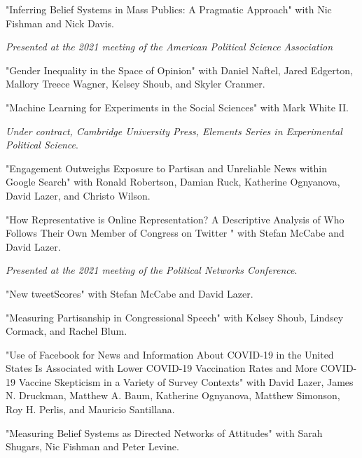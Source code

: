 \documentclass[letterpaper]{article}
\renewenvironment{itemize}{
  \begin{list}{}{
    \setlength{\leftmargin}{1.5em}
  }
}{
  \end{list}
}
\begin{document}
\begin{itemize}

\item "Inferring Belief Systems in Mass Publics: A Pragmatic Approach" with Nic Fishman and Nick Davis.
\begin{itemize}
\item \textit{Presented at the 2021 meeting of the American Political Science Association}
\end{itemize} 

\item "Gender Inequality in the Space of Opinion" with Daniel Naftel, Jared Edgerton, Mallory Treece Wagner, Kelsey Shoub, and Skyler Cranmer.

\item "Machine Learning for Experiments in the Social Sciences" with Mark White II.
\begin{itemize}
\item  \textit{Under contract, Cambridge University Press, Elements Series in Experimental Political Science}.
\end{itemize}

\item "Engagement Outweighs Exposure to Partisan and Unreliable News within Google Search" with Ronald Robertson, Damian Ruck, Katherine Ognyanova, David Lazer, and Christo Wilson.

\item "How Representative is Online Representation? A Descriptive Analysis of Who Follows Their Own Member of Congress on Twitter " with Stefan McCabe and David Lazer.
\begin{itemize}
\item \textit{Presented at the 2021 meeting of the Political Networks Conference}.
\end{itemize} 

\item "New tweetScores" with Stefan McCabe and David Lazer.

\item "Measuring Partisanship in Congressional Speech" with Kelsey Shoub, Lindsey Cormack, and Rachel Blum.

\item "Use of Facebook for News and Information About COVID-19 in the United States Is Associated with Lower COVID-19 Vaccination Rates and More COVID-19 Vaccine Skepticism in a Variety of Survey Contexts" with David Lazer, James N. Druckman, Matthew A. Baum, Katherine Ognyanova, Matthew Simonson, Roy H. Perlis, and Mauricio Santillana.

\item "Measuring Belief Systems as Directed Networks of Attitudes" with Sarah Shugars, Nic Fishman and Peter Levine.

\end{itemize}
\end{document}
